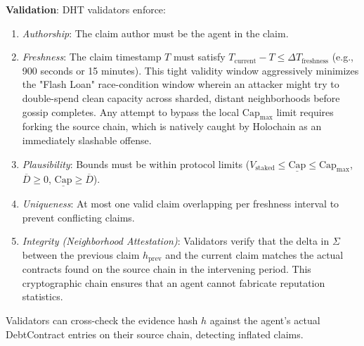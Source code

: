\documentclass[11pt]{article}
\begin{document}
\textbf{Validation}: DHT validators enforce:
\begin{enumerate}
    \item \emph{Authorship}: The claim author must be the agent in the claim.
    \item \emph{Freshness}: The claim timestamp $T$ must satisfy $T_{\text{current}} - T \leq \Delta T_{\text{freshness}}$ (e.g., 900 seconds or 15 minutes). This tight validity window aggressively minimizes the "Flash Loan" race-condition window wherein an attacker might try to double-spend clean capacity across sharded, distant neighborhoods before gossip completes. Any attempt to bypass the local $\text{Cap}_{\max}$ limit requires forking the source chain, which is natively caught by Holochain as an immediately slashable offense.
    \item \emph{Plausibility}: Bounds must be within protocol limits ($V_{\text{staked}} \leq \underline{\text{Cap}} \leq \text{Cap}_{\max}$, $\overline{D} \geq 0$, $\underline{\text{Cap}} \geq \overline{D}$).
    \item \emph{Uniqueness}: At most one valid claim overlapping per freshness interval to prevent conflicting claims.
    \item \emph{Integrity (Neighborhood Attestation)}: Validators verify that the delta in $\Sigma$ between the previous claim $h_{\text{prev}}$ and the current claim matches the actual contracts found on the source chain in the intervening period. This cryptographic chain ensures that an agent cannot fabricate reputation statistics.
\end{enumerate}

Validators can cross-check the evidence hash $h$ against the agent's actual DebtContract entries on their source chain, detecting inflated claims.
\end{document}
